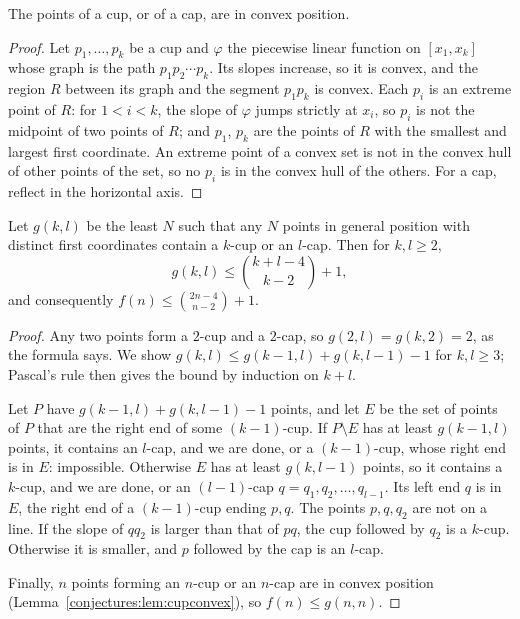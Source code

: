 \begin{lemma}\label{conjectures:lem:cupconvex}
The points of a cup, or of a cap, are in convex position.
\end{lemma}
\begin{proof}
Let $p_1,\dots,p_k$ be a cup and $\varphi$ the piecewise linear function on $[x_1,x_k]$ whose graph is the path $p_1p_2\cdots p_k$. Its slopes increase,
so it is convex, and the region $R$ between its graph and the segment $p_1p_k$ is convex. Each $p_i$ is an extreme point of $R$: for $1<i<k$, the slope of
$\varphi$ jumps strictly at $x_i$, so $p_i$ is not the midpoint of two points of $R$; and $p_1$, $p_k$ are the points of $R$ with the smallest and
largest first coordinate. An extreme point of a convex set is not in the convex hull of other points of the set, so no $p_i$ is in the convex hull of
the others. For a cap, reflect in the horizontal axis.
\end{proof}

\begin{theorem}\label{conjectures:thm:cupcap}
Let $g(k,l)$ be the least $N$ such that any $N$ points in general position with distinct first coordinates contain a $k$-cup or an $l$-cap. Then for
$k,l\ge2$,
\[
g(k,l)\le\binom{k+l-4}{k-2}+1,
\]
and consequently $f(n)\le\binom{2n-4}{n-2}+1$.
\end{theorem}
\begin{proof}
Any two points form a $2$-cup and a $2$-cap, so $g(2,l)=g(k,2)=2$, as the formula says. We show $g(k,l)\le g(k-1,l)+g(k,l-1)-1$ for $k,l\ge3$;
Pascal's rule then gives the bound by induction on $k+l$.

Let $P$ have $g(k-1,l)+g(k,l-1)-1$ points, and let $E$ be the set of points of $P$ that are the right end of some $(k-1)$-cup. If $P\setminus E$ has at
least $g(k-1,l)$ points, it contains an $l$-cap, and we are done, or a $(k-1)$-cup, whose right end is in $E$: impossible. Otherwise $E$ has at least
$g(k,l-1)$ points, so it contains a $k$-cup, and we are done, or an $(l-1)$-cap $q=q_1,q_2,\dots,q_{l-1}$. Its left end $q$ is in $E$, the right end of a
$(k-1)$-cup ending $p,q$. The points $p,q,q_2$ are not on a line. If the slope of $qq_2$ is larger than that of $pq$, the cup followed by $q_2$ is a
$k$-cup. Otherwise it is smaller, and $p$ followed by the cap is an $l$-cap.

Finally, $n$ points forming an $n$-cup or an $n$-cap are in convex position (Lemma~\ref{conjectures:lem:cupconvex}), so $f(n)\le g(n,n)$.
\end{proof}

